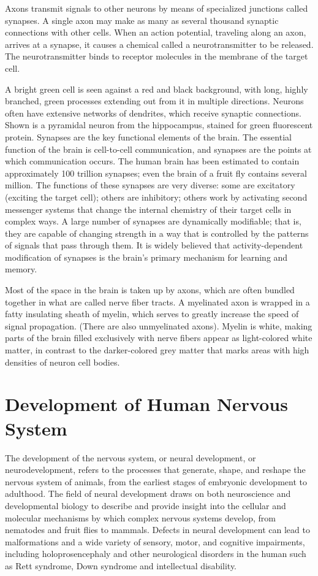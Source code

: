 Axons transmit signals to other neurons by means of specialized junctions called synapses. A single axon may make as many as several thousand synaptic connections with other cells. When an action potential, traveling along an axon, arrives at a synapse, it causes a chemical called a neurotransmitter to be released. The neurotransmitter binds to receptor molecules in the membrane of the target cell.

A bright green cell is seen against a red and black background, with long, highly branched, green processes extending out from it in multiple directions.
Neurons often have extensive networks of dendrites, which receive synaptic connections. Shown is a pyramidal neuron from the hippocampus, stained for green fluorescent protein.
Synapses are the key functional elements of the brain. The essential function of the brain is cell-to-cell communication, and synapses are the points at which communication occurs. The human brain has been estimated to contain approximately 100 trillion synapses; even the brain of a fruit fly contains several million. The functions of these synapses are very diverse: some are excitatory (exciting the target cell); others are inhibitory; others work by activating second messenger systems that change the internal chemistry of their target cells in complex ways. A large number of synapses are dynamically modifiable; that is, they are capable of changing strength in a way that is controlled by the patterns of signals that pass through them. It is widely believed that activity-dependent modification of synapses is the brain's primary mechanism for learning and memory.

Most of the space in the brain is taken up by axons, which are often bundled together in what are called nerve fiber tracts. A myelinated axon is wrapped in a fatty insulating sheath of myelin, which serves to greatly increase the speed of signal propagation. (There are also unmyelinated axons). Myelin is white, making parts of the brain filled exclusively with nerve fibers appear as light-colored white matter, in contrast to the darker-colored grey matter that marks areas with high densities of neuron cell bodies.

\hypertarget{development-of-human-nervous-system}{%
\chapter{Development of Human Nervous System}\label{development-of-human-nervous-system}}

The development of the nervous system, or neural development, or neurodevelopment, refers to the processes that generate, shape, and reshape the nervous system of animals, from the earliest stages of embryonic development to adulthood. The field of neural development draws on both neuroscience and developmental biology to describe and provide insight into the cellular and molecular mechanisms by which complex nervous systems develop, from nematodes and fruit flies to mammals. Defects in neural development can lead to malformations and a wide variety of sensory, motor, and cognitive impairments, including holoprosencephaly and other neurological disorders in the human such as Rett syndrome, Down syndrome and intellectual disability.

